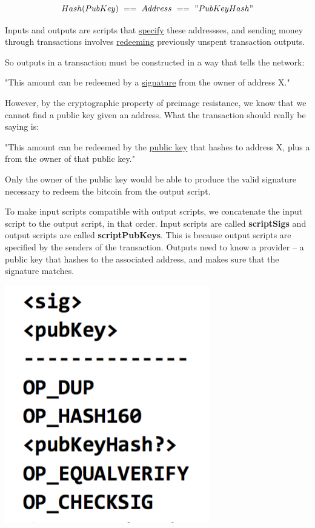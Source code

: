 \documentclass[11pt]{article}
\begin{document}
   $$Hash(PubKey)~==~Address~==~"PubKeyHash"$$
   
   Inputs and outputs are scripts that \underline{specify} these addressses, and sending money through transactions involves \underline{redeeming} previously unspent transaction outputs.
   
   So outputs in a transaction must be constructed in a way that tells the network:
   
   "This amount can be redeemed by a \underline{signature} from the owner of address X." 
   
   However, by the cryptographic property of preimage resistance, we know that we cannot find a public key given an address. What the transaction should really be saying is:
   
   "This amount can be redeemed by the \underline{public key} that hashes to address X, plus a  from the owner of that public key."
   
   Only the owner of the public key would be able to produce the valid signature necessary to redeem the bitcoin from the output script.
   
   To make input scripts compatible with output scripts, we concatenate the input script to the output script, in that order. Input scripts are called \textbf{scriptSigs} and output scripts are called \textbf{scriptPubKeys}. This is because output scripts are specified by the senders of the transaction. Outputs need to know a provider -- a public key that hashes to the associated address, and makes sure that the signature matches.
   
  \includegraphics[scale=1]{output_script}
  
\end{document}
